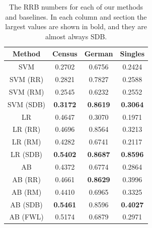 \documentclass[twoside,leqno,twocolumn]{article}
\begin{document}
\begin{table}[h]
\centering
\begin{tabular}{| c | ccc |}
\hline
               Method    & Census & German & Singles \\ 
\hline 
               SVM       & 0.2702 & 0.6756 & 0.2424  \\ 
               SVM (RR)  & 0.2821 & 0.7827 & 0.2588  \\ 
               SVM (RM)  & 0.2545 & 0.6232 & 0.2552  \\ 
               SVM (SDB) & \textbf{0.3172} & \textbf{0.8619} & \textbf{0.3064}  \\ 
\hline
               LR        & 0.4647 & 0.3070 & 0.1971  \\ 
               LR (RR)   & 0.4696 & 0.8564 & 0.3213  \\ 
               LR (RM)   & 0.4282 & 0.6741 & 0.2117  \\ 
               LR (SDB)  & \textbf{0.5402} & \textbf{0.8687} & \textbf{0.8596}  \\ 
\hline
               AB        & 0.4372 & 0.6774 & 0.2864  \\ 
               AB (RR)   & 0.4661 & \textbf{0.8629} & 0.3996  \\ 
               AB (RM)   & 0.4410 & 0.6965 & 0.3325  \\ 
               AB (SDB)  & \textbf{0.5461} & 0.8596 & \textbf{0.4027}  \\ 
               AB (FWL)  & 0.5174 & 0.6879 & 0.2971  \\ 
\hline
\end{tabular}
\caption{The RRB numbers for each of our methods and baselines. In each column
and section the largest values are shown in bold, and they are almost always
SDB.}
\label{table:rrb}
\end{table}
\end{document}
